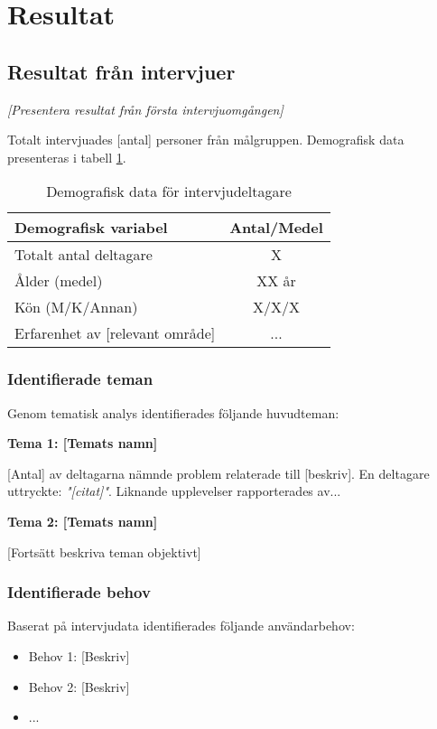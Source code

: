\section{Resultat}
\label{sec:resultat_test}

\subsection{Resultat från intervjuer}

\textit{[Presentera resultat från första intervjuomgången]}

Totalt intervjuades [antal] personer från målgruppen. Demografisk data presenteras i tabell \ref{tab:demografi}.

\begin{table}[h]
\centering
\begin{tabular}{|l|c|}
\hline
\textbf{Demografisk variabel} & \textbf{Antal/Medel} \\
\hline
Totalt antal deltagare & X \\
Ålder (medel) & XX år \\
Kön (M/K/Annan) & X/X/X \\
Erfarenhet av [relevant område] & ... \\
\hline
\end{tabular}
\caption{Demografisk data för intervjudeltagare}
\label{tab:demografi}
\end{table}


\subsubsection{Identifierade teman}

Genom tematisk analys identifierades följande huvudteman:

\textbf{Tema 1: [Temats namn]}

[Antal] av deltagarna nämnde problem relaterade till [beskriv]. En deltagare uttryckte: \textit{"[citat]"}. Liknande upplevelser rapporterades av...

\textbf{Tema 2: [Temats namn]}

[Fortsätt beskriva teman objektivt]


\subsubsection{Identifierade behov}

Baserat på intervjudata identifierades följande användarbehov:
\begin{itemize}
    \item Behov 1: [Beskriv]
    \item Behov 2: [Beskriv]
    \item ...
\end{itemize}


